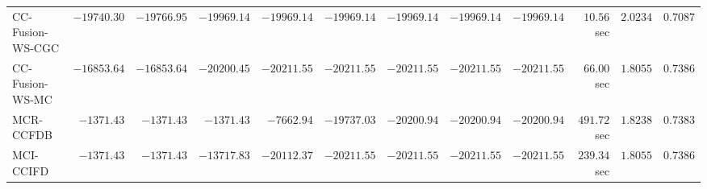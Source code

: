 \begin{table}[H]
\begin{tabular}{lrrrrrrrrrrr}
    CC-Fusion-WS-CGC & $    -19740.30$ & $    -19766.95$ & $    -19969.14$ & $    -19969.14$ & $    -19969.14$ & $    -19969.14$ & $    -19969.14$ & $    -19969.14$ & $        10.56$ sec    & $       2.0234$  & $       0.7087$ \\ 
     CC-Fusion-WS-MC & $    -16853.64$ & $    -16853.64$ & $    -20200.45$ & $    -20211.55$ & $    -20211.55$ & $    -20211.55$ & $    -20211.55$ & $    -20211.55$ & $        66.00$ sec    & $       1.8055$  & $       0.7386$ \\ 
\cmidrule{1-1} 
           MCR-CCFDB & $     -1371.43$ & $     -1371.43$ & $     -1371.43$ & $     -7662.94$ & $    -19737.03$ & $    -20200.94$ & $    -20200.94$ & $    -20200.94$ & $       491.72$ sec    & $       1.8238$  & $       0.7383$ \\ 
\cmidrule{1-1} 
           MCI-CCIFD & $     -1371.43$ & $     -1371.43$ & $    -13717.83$ & $    -20112.37$ & $    -20211.55$ & $    -20211.55$ & $    -20211.55$ & $    -20211.55$ & $       239.34$ sec    & $       1.8055$  & $       0.7386$ \\ 
\bottomrule
\end{tabular}
\end{table}

